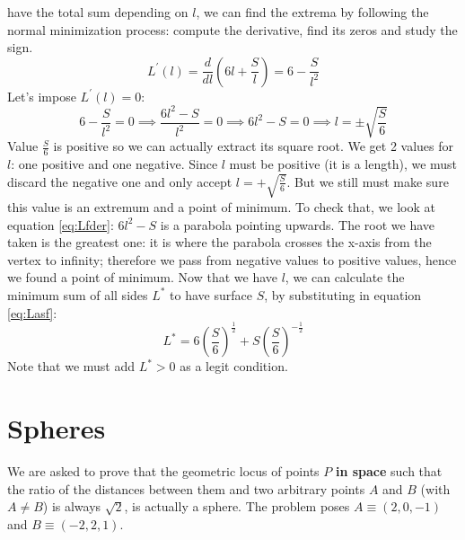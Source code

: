 have the total sum depending on $l$, we can find the extrema by following the normal
minimization process: compute the derivative, find its zeros and study the sign.
\begin{equation}\label{eq:Lfder}
    L^\prime(l) = \frac{d}{dl} \left( 6l + \frac{S}{l} \right) = 6 - \frac{S}{l^2}
\end{equation}
Let's impose $L^\prime(l) = 0$:
\begin{equation}\label{eq:Lroots}
    6 - \frac{S}{l^2} = 0 \implies \frac{6l^2 - S}{l^2} = 0 \implies
        6l^2 - S = 0 \implies l = \pm \sqrt{\frac{S}{6}}
\end{equation}
Value $\frac{S}{6}$ is positive so we can actually extract its square
root. We get 2 values
for $l$: one positive and one negative.
Since $l$ must be positive (it is a length), we must discard the negative one and
only accept $l = +\sqrt{\frac{S}{6}}$. But we still must make sure this value is
an extremum and a point of minimum.
To check that, we look at equation \ref{eq:Lfder}: $6l^2 - S$ is a parabola
pointing upwards. The root
we have taken is the greatest one: it is where the parabola crosses the x-axis
from the vertex to infinity; therefore we pass from negative values to positive values,
hence we found a point of minimum. Now that we have $l$, we can calculate the minimum sum of all
sides $L^\ast$ to have surface $S$, by substituting in equation \ref{eq:Lasf}:
\begin{equation*}
    L^\ast =  6 \left( \frac{S}{6} \right)^{\frac{1}{2}} + S \left( \frac{S}{6} \right)^{-\frac{1}{2}}
\end{equation*}
Note that we must add $L^\ast > 0$
as a legit condition.

\section{Spheres}
\label{sec:speheres}
We are asked to
prove that the geometric locus of points $P$ \textbf{in space} such that the ratio
of the distances between them and two arbitrary points $A$ and $B$ (with $A \neq B$)
is always $\sqrt{2}$, is actually a sphere. The problem poses $A \equiv (2,0,-1)$ and
$B \equiv (-2,2,1)$.

